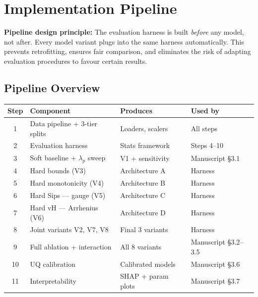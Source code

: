 \documentclass[12pt,a4paper]{article}
\begin{document}
\section{Implementation Pipeline}

\begin{rationalebox}
\textbf{Pipeline design principle:} The evaluation harness is built
\emph{before} any model, not after. Every model variant plugs into
the same harness automatically. This prevents retrofitting, ensures
fair comparison, and eliminates the risk of adapting evaluation
procedures to favour certain results.
\end{rationalebox}

\subsection*{Pipeline Overview}

\begin{center}
\small
\begin{tabular}{clll}
\toprule
\textbf{Step} & \textbf{Component} & \textbf{Produces} & \textbf{Used by} \\
\midrule
1 & Data pipeline + 3-tier splits & Loaders, scalers & All steps \\
2 & Evaluation harness & Stats framework & Steps 4--10 \\
3 & Soft baseline + $\lambda_p$ sweep & V1 + sensitivity & Manuscript \S3.1 \\
4 & Hard bounds (V3) & Architecture A & Harness \\
5 & Hard monotonicity (V4) & Architecture B & Harness \\
6 & Hard Sips --- gauge (V5) & Architecture C & Harness \\
7 & Hard vH --- Arrhenius (V6) & Architecture D & Harness \\
8 & Joint variants V2, V7, V8 & Final 3 variants & Harness \\
9 & Full ablation + interaction & All 8 variants & Manuscript \S3.2--3.5 \\
10 & UQ calibration & Calibrated models & Manuscript \S3.6 \\
11 & Interpretability & SHAP + param plots & Manuscript \S3.7 \\
\bottomrule
\end{tabular}
\end{center}
\end{document}
